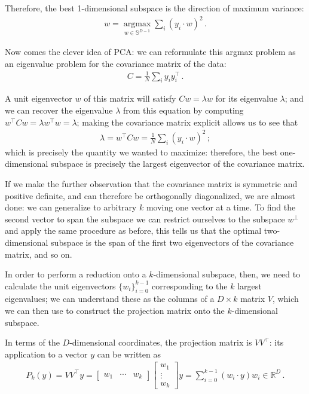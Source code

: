 \documentclass[main.tex]{subfiles}
\begin{document}
Therefore, the best 1-dimensional subspace is the direction of maximum variance: 
%
\begin{align}
w = \underset{w \in \mathbb{S}^{D-1}}{\operatorname{argmax}} \sum _{i} (y_i \cdot w)^2
\,.
\end{align}
%

Now comes the clever idea of \ac{PCA}: we can reformulate this argmax problem as an eigenvalue problem for the covariance matrix of the data: 
%
\begin{align}
C = \frac{1}{N} \sum _{i} y_i y_i^{\top}
\,.
\end{align}

A unit eigenvector \(w\) of this matrix will satisfy \(Cw = \lambda w\) for its eigenvalue \(\lambda \); and we can recover the eigenvalue \(\lambda\) from this equation by computing \(w^{\top} C w = \lambda w^{\top} w = \lambda \); making the covariance matrix explicit allows us to see that 
%
\begin{align}
\lambda = w^{\top} C w =  \frac{1}{N }\sum _{i} (y_i \cdot w)^2
\,;
\end{align}
%
which is precisely the quantity we wanted to maximize: therefore, the best one-dimensional subspace is precisely the largest eigenvector of the covariance matrix. 

If we make the further observation that the covariance matrix is symmetric and positive definite, and can therefore be orthogonally diagonalized, we are almost done: we can generalize to arbitrary \(k\) moving one vector at a time. 
To find the second vector to span the subspace we can restrict ourselves to the subspace \(w^{\perp}\) and apply the same procedure as before, this tells us that the optimal two-dimensional subspace is the span of the first two eigenvectors of the covariance matrix, and so on. 

In order to perform a reduction onto a \(k\)-dimensional subspace, then, we need to calculate the unit eigenvectors \(\{ w_i\}_{i=0}^{k-1}\) corresponding to the \(k\) largest eigenvalues;
we can understand these as the columns of a \(D \times k\) matrix \(V\), which we can then use to construct the projection matrix onto the \(k\)-dimensional subspace.

In terms of the \(D\)-dimensional coordinates, the projection matrix is \(V V^{\top}\): its application to a vector \(y\) can be written as 
%
\begin{align}
P_k (y) = V V^{\top} y = \left[\begin{array}{ccc}
w_1  & \cdots & w_k
\end{array}\right] 
\left[\begin{array}{c}
w_1  \\ 
\vdots \\ 
w_k
\end{array}\right]
y 
= \sum _{i=0}^{k-1}
(w_i \cdot y) w_i \in \mathbb{R}^{D}
\,.
\end{align}
\end{document}
